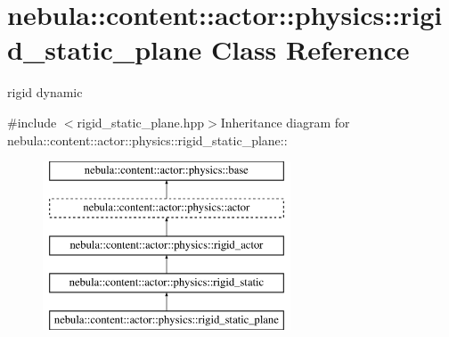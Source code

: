\hypertarget{classnebula_1_1content_1_1actor_1_1physics_1_1rigid__static__plane}{
\section{nebula::content::actor::physics::rigid\_\-static\_\-plane Class Reference}
\label{classnebula_1_1content_1_1actor_1_1physics_1_1rigid__static__plane}
}


rigid dynamic  


{\ttfamily \#include $<$rigid\_\-static\_\-plane.hpp$>$}Inheritance diagram for nebula::content::actor::physics::rigid\_\-static\_\-plane::\begin{figure}[H]
\begin{center}
\leavevmode
\includegraphics[height=5cm]{classnebula_1_1content_1_1actor_1_1physics_1_1rigid__static__plane}
\end{center}
\end{figure}
